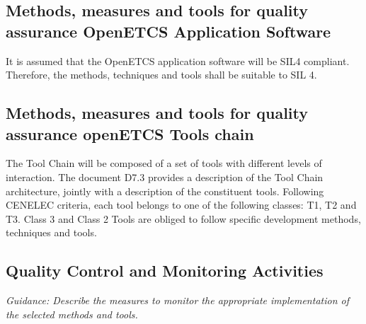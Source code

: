 \documentclass{template/openetcs_article}
\begin{document}
\subsection{Methods, measures and tools for quality assurance OpenETCS Application Software}

It is assumed that the OpenETCS application software will be SIL4 compliant. Therefore, the methods, techniques and tools shall be suitable to SIL 4. 





\subsection{Methods, measures and tools for quality assurance openETCS Tools chain}

The Tool Chain will be composed of a set of tools with different levels of interaction. The document D7.3 provides a description of the Tool Chain architecture, jointly with a description of the constituent tools.
Following CENELEC criteria, each tool belongs to one of the following classes: T1, T2 and T3. Class 3 and Class 2 Tools are obliged to follow specific development methods, techniques and tools. 


\subsection{Quality Control and Monitoring Activities}
\textit{Guidance: Describe the measures to monitor the appropriate implementation of the selected methods and tools.}


\end{document}
